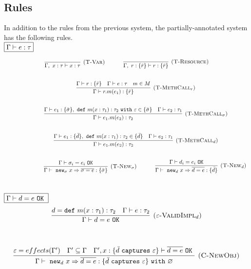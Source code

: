 \documentclass{llncs}
\newcommand{\keywadj}[1]{\mathtt{#1}}
\newcommand{\keyw}[1]{\keywadj{#1}~}
\begin{document}
\subsection{Rules}

In addition to the rules from the previous system, the partially-annotated system has the following rules.\\

$\fbox{$\Gamma \vdash e : \tau$}$

\[
\begin{array}{c}
\infer[\textsc{(T-Var)}]
	{\Gamma,~x : \tau \vdash x : \tau}
	{}
~~~~~~~~~~
\infer[\textsc{(T-Resource)}]
	{\Gamma,~r : \{ \bar r \} \vdash r : \{ \bar r \}}
	{} \\[5ex]
~~~~~~~~~~
\infer[\textsc{(T-MethCall$_r$)}]
	{\Gamma \vdash r.m(e_1) : \{ \bar r\}}
	{\Gamma \vdash r : \{ \bar r \} & \Gamma \vdash e : \tau & m \in M} \\[5ex]
~~~~~~~~~~
\infer[\textsc{(T-MethCall$_\sigma$)}]
	{\Gamma \vdash e_1.m(e_2) : \tau_2}
	{\Gamma \vdash e_1 : \{ \bar \sigma \},~\keyw{def} m(x : \tau_1) : \tau_2~\keyw{with} \varepsilon \in \{ \bar \sigma \} &  \Gamma \vdash e_2 : \tau_1 }\\[5ex]
~~~~~~~~~~
\infer[\textsc{(T-MethCall$_d$)}]
	{\Gamma \vdash e_1.m(e_2) : \tau_2}
	{\Gamma \vdash e_1 : \{ \bar d\},~\keyw{def} m(x : \tau_1) : \tau_2 \in \{ \bar d \} &  \Gamma \vdash e_2 : \tau_1 }\\[5ex]
~~~~~~~~~~

~~~~~~~~~~
\infer[\textsc{(T-New$_\sigma$)}]
	{\Gamma \vdash~\keywadj{new}_\sigma~x \Rightarrow \overline{\sigma = e} : \{ \bar \sigma \}}
	{\Gamma \vdash \sigma_i = e_i~\keywadj{OK}}
~~~~~~~~~~
\infer[\textsc{(T-New$_d$)}]
	{\Gamma \vdash~\keywadj{new}_d~x \Rightarrow \overline{d = e} : \{ \bar d \}}
	{\Gamma \vdash d_i = e_i~\keywadj{OK}}\\[5ex]
\end{array}
\]

$\fbox{$\Gamma \vdash d = e~\keyw{OK}$}$
\[
\begin{array}{c}
\infer[\textsc{($\varepsilon$-ValidImpl$_d$)}]
	{\Gamma \vdash d = e~\keywadj{OK}}
	{d = \keyw{def} m(x : \tau_1) : \tau_2 & \Gamma \vdash e : \tau_2}
	\\[5ex]
\end{array}
\]

\fbox{$\Gamma \vdash e_1.m(e_2) : \tau~\keyw{with} \varepsilon$}

\[
\begin{array}{c}
\infer[\textsc{(C-NewObj)}]
	{\Gamma \vdash~\keywadj{new}_d~x \Rightarrow \overline{d = e} : \{  \bar d~\keyw{captures} \varepsilon \} ~\keyw{with} \varnothing }
	{\varepsilon = effects(\Gamma') & \Gamma' \subseteq \Gamma & \Gamma', x : \{ \bar d~\keyw {captures} \varepsilon \} \vdash \overline{d = e}~\keyw{OK}} \\[5ex]
\end{array}
\]
\end{document}
